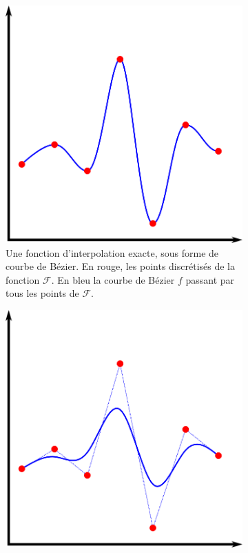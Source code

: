 {{{		    \begin{figure}[!h]
		        \centering
		        \begin{subfigure}{.49\linewidth}
		            \centering
		            \includegraphics[width=.8\linewidth]{img/interpolation_exact.png}
		            \captionsetup{width=.8\linewidth}
		            \caption{Une fonction d'interpolation exacte, sous forme de courbe de Bézier. En rouge, les points discrétisés de la fonction $\mathcal{F}$. En bleu la courbe de Bézier $f$ passant par tous les points de $\mathcal{F}$.}
		            \label{img:interpolation_types:exact}
		        \end{subfigure}
		        \begin{subfigure}{.49\linewidth}
		            \centering
		            \includegraphics[width=.8\linewidth]{img/interpolation_inexact.png}

\end{subfigure}
\end{figure}}}}
